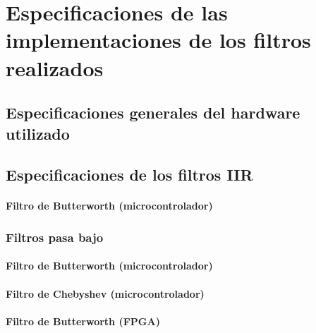 \documentclass[oneside,a4paper,10pt]{scrbook}
\begin{document}
	\chapter{Especificaciones de las implementaciones de los filtros realizados}
	{
		\section{Especificaciones generales del hardware utilizado}
		{	
			
		}
		
		\clearpage
		
		\section{Especificaciones de los filtros IIR}
		{
		
			\subsubsection{Filtro de Butterworth  (microcontrolador)}
			{
					
			}
		
			\clearpage		
		
			\subsection{Filtros pasa bajo}
			{
				\subsubsection{Filtro de Butterworth  (microcontrolador)}
				{
					
				}
				
				\clearpage	
							
				\subsubsection{Filtro de Chebyshev (microcontrolador)}
				{
						
				}
								
				\clearpage	
				
				\subsubsection{Filtro de Butterworth (FPGA)}
				{
						
				}
			}
			
}}
\end{document}
